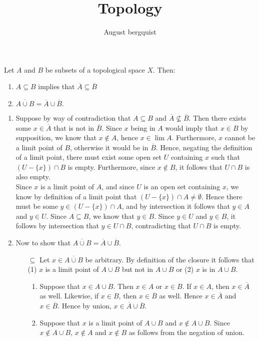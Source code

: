 \documentclass{article}
\title{Topology}
\author{August bergquist}
\begin{document}
\maketitle

 Let $A$ and $B$ be subsets of a topological space $X$. Then:
\begin{enumerate}
    \item $A\subseteq B$ implies that $\overline{A}\subseteq \overline{B}$
    \item $\overline{A\cup B} = \overline{A}\cup \overline{B}.$
\end{enumerate}

\begin{enumerate}
    \item Suppose by way of contradiction that $A\subseteq B$ and $\overline{A}\not\subseteq \overline{B}$. Then there exists some $x\in \overline{A}$ that is not in $\overline{B}$. Since $x$ being in $A$ would imply that $x\in B$ by supposition, we know that $x\not \in A$, hence $x\in \lim A$. Furthermore, $x$ cannot be a limit point of $B$, otherwise it would be in $\overline{B}$. Hence, negating the definition of a limit point, there must exist some open set $U$ containing $x$ such that $(U-\{x\})\cap B$ is empty. Furthermore, since $x\not\in B$, it follows that $U\cap B$ is also empty. \\
    
    Since $x$ is a limit point of $A$, and since $U$ is an open set containing $x$, we know by definition of a limit point that $(U-\{x\})\cap A \ne \emptyset$. Hence there must be some $y\in (U-\{x\})\cap A$, and by intersection it follows that $y\in A$ and $y\in U$. Since $A\subseteq B$, we know that $y\in B$. Since $y\in U$ and $y\in B$, it follows by intersection that $y\in U\cap B$, contradicting that $U\cap B$ is empty.
    \item Now to show that $\overline{A\cup B} = \overline{A}\cup \overline{B}$.
    \begin{itemize}
        \item[$\subseteq$] Let $x\in \overline{A\cup B}$ be arbitrary. By definition of the closure it follows that (1) $x$ is a limit point of $A\cup B$ but not in $A\cup B$ or (2) $x$ is in $A\cup B$.
        \begin{enumerate}
            \item Suppose that $x \in A\cup B$. Then $x\in A$ or $x\in B$. If $x\in A$, then $x\in \overline{A}$ as well. Likewise, if $x\in B$, then $x\in \overline{B}$ as well. Hence $x\in \overline{A}$ and $x\in \overline{B}$. Hence by union, $x\in \overline{A}\cup \overline{B}$.
            \item Suppose that $x$ is a limit point of $A\cup B$ and $x\not\in A\cup B$. Since $x\not\in A\cup B$, $x\not\in A$ and $x\not\in B$ as follows from the negation of union.  \\
            

\end{enumerate}
\end{itemize}
\end{enumerate}
\end{document}
